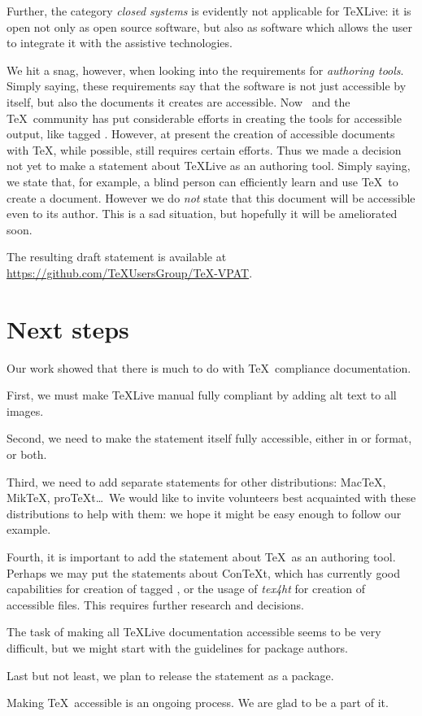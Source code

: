 \documentclass{ltugboat}
\begin{document}
Further, the category \emph{closed systems} is evidently not
applicable for \TeX Live: it is open not only as open source software,
but also as software which allows the user to integrate it with the
assistive technologies.

We hit a snag, however, when looking into the requirements for
\emph{authoring tools}.  Simply saying, these requirements say that
the software is not just accessible by itself, but also the documents
it creates are accessible.  Now \tug\ and the \TeX\ community has put
considerable efforts in creating the tools for accessible output, like
tagged .  However, at present the creation of accessible
documents with \TeX, while possible, still requires certain efforts.
Thus we made a decision not yet to make a statement about \TeX Live as
an authoring tool.  Simply saying, we state that, for example, a
blind person can efficiently learn and use \TeX\ to create a
document.  However we do \emph{not} state that this document will be
accessible even to its author.  This is a sad situation, but hopefully
it will be ameliorated soon.

The resulting draft statement is available at
\url{https://github.com/TeXUsersGroup/TeX-VPAT}.

\section{Next steps}
\label{sec:next_steps}

Our work showed that there is much to do with \TeX\ compliance
documentation.

First, we must make \TeX Live manual fully compliant by adding alt
text to all images.

Second, we need to make the statement itself fully accessible, either
in  or  format, or both.

Third, we need to add separate statements for other distributions:
Mac\TeX, Mik\TeX, pro\TeX t\ldots\  We would like to invite volunteers
best acquainted with these distributions to help with them:  we hope it
might be easy enough to follow our example.

Fourth, it is important to add the statement about \TeX\ as an
authoring tool.  Perhaps we may put the statements about Con\TeX t,
which has currently good capabilities for creation of tagged
, or the usage of \textsl{tex4ht} for creation of accessible
 files.  This requires further research and decisions.

The task of making all \TeX Live documentation accessible seems to be
very difficult, but we might start with the guidelines for package
authors.

Last but not least, we plan to release the statement as a 
package.

Making \TeX\ accessible is an ongoing process.  We are glad to be a
part of it.

\makesignature
\end{document}
